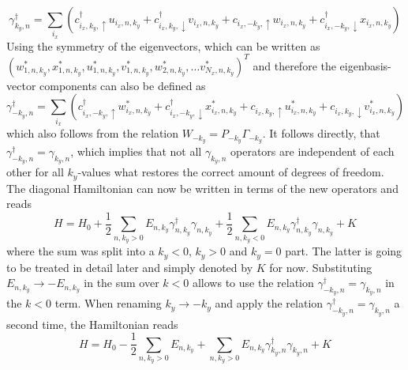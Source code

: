 \begin{equation}
    \gamma^{\dag}_{k_y,n} = \sum_{i_x} \left( c^{\dag}_{i_x,k_y,\uparrow} u_{i_x,n,k_y} + c^{\dag}_{i_x,k_y,\downarrow}v_{i_x,n,k_y} + c_{i_x,-k_y,\uparrow} w_{i_x,n,k_y} + c^{\dag}_{i_x,-k_y,\downarrow} x_{i_x,n,k_y}\right)
\end{equation}
Using the symmetry of the eigenvectors, which can be written as \\ $\left( w^*_{1,n,k_y}, x^*_{1,n,k_y}, u^*_{1,n,k_y}, v^*_{1,n,k_y}, w^*_{2,n,k_y}, \hdots v^*_{N_x,n,k_y}\right)^T$ and therefore the eigenbasis-vector components can also be defined as 
\begin{equation}
    \gamma^{\dag}_{-k_y,n} = \sum_{i_x} \left( c^{\dag}_{i_x,-k_y,\uparrow} w^*_{i_x,n,k_y} + c^{\dag}_{i_x,-k_y,\downarrow} x^*_{i_x,n,k_y} + c_{i_x,k_y,\uparrow} u^*_{i_x,n,k_y} + c_{i_x,k_y,\downarrow} v^*_{i_x,n,k_y}\right) 
\end{equation}
which also follows from the relation $W_{-k_y} = P_{-k_y}\Gamma_{-k_y}$.
It follows directly, that $\gamma^{\dag}_{-k_y,n} = \gamma_{k_y,n}$, which implies that not all $\gamma_{k_y,n}$ operators are independent of each other for all $k_y$-values what restores the correct amount of degrees of freedom. \newline
The diagonal Hamiltonian can now be written in terms of the new operators and reads
\begin{equation} \nonumber
    H = H_0 + \frac{1}{2} \sum_{n,k_y>0} E_{n,k_y}\gamma^{\dag}_{n,k_y}\gamma_{n,k_y} + \frac{1}{2} \sum_{n,k_y<0} E_{n,k_y}\gamma^{\dag}_{n,k_y}\gamma_{n,k_y} + K
\end{equation}
where the sum was split into a $k_y<0$, $k_y>0$ and $k_y=0$ part.
The latter is going to be treated in detail later and simply denoted by $K$ for now.
Substituting $E_{n,k_y} \rightarrow -E_{n,k_y}$ in the sum over $k<0$ allows to use the relation $\gamma^{\dag}_{-k_y,n} = \gamma_{k_y,n}$ in the $k<0$ term.
When renaming $k_y \rightarrow -k_y$ and apply the relation $\gamma^{\dag}_{-k_y,n} = \gamma_{k_y,n}$ a second time, the Hamiltonian reads
\begin{equation} \nonumber
    H = H_0 -\frac{1}{2} \sum_{n, k_y >0} E_{n,k_y} + \sum_{n, k_y >0} E_{n,k_y}\gamma^{\dag}_{k_y,n}\gamma_{k_y,n} + K
\end{equation}
